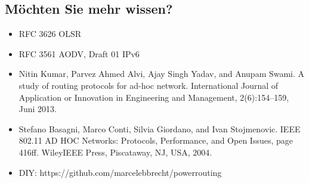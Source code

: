 \documentclass[11pt,landscape]{beamer}
\begin{document}
\subsection{Möchten Sie mehr wissen?}

\begin{frame}{\insertsubsection}
\begin{itemize}
\item RFC 3626 OLSR
\item RFC 3561 AODV, Draft 01 IPv6
\item Nitin Kumar, Parvez Ahmed Alvi, Ajay Singh Yadav, and Anupam Swami.
A study of routing protocols for ad-hoc network. International Journal of Application or Innovation in Engineering and Management, 2(6):154–159, Juni 2013.
\item Stefano Basagni, Marco Conti, Silvia Giordano, and Ivan Stojmenovic. IEEE
802.11 AD HOC Networks: Protocols, Performance, and Open Issues, page
416ff. WileyIEEE Press, Piscataway, NJ, USA, 2004.
\item DIY: https://github.com/marcelebbrecht/powerrouting
\end{itemize}
\end{frame}
\end{document}

